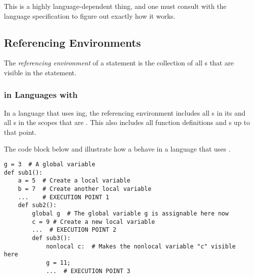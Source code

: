 \begin{remark*}
  This is a highly language-dependent thing, and one must consult with the language specification to figure out exactly how it works.
\end{remark*}

\subsection{Referencing Environments}\label{subsec:Referencing_Environments}
\begin{definition}\label{def:Referencing_Environment}
  The \emph{referencing environment} of a statement is the collection of all s that are visible in the statement.
\end{definition}

\subsubsection{ in Languages with }\label{subsubsec:Static_Scope_Referencing_Environment}
In a language that uses ing, the referencing environment includes all s in its  and all s in the  scopes that are .
This also includes all function definitions and s up to that point.

The code block below and  illustrate how a  behave in a language that uses .

\begin{verbatim}
g = 3  # A global variable
def sub1():
    a = 5  # Create a local variable
    b = 7  # Create another local variable
    ...    # EXECUTION POINT 1
    def sub2():
        global g  # The global variable g is assignable here now
        c = 9 # Create a new local variable
        ...  # EXECUTION POINT 2
        def sub3():
            nonlocal c:  # Makes the nonlocal variable "c" visible here
            g = 11;
            ...  # EXECUTION POINT 3
\end{verbatim}

